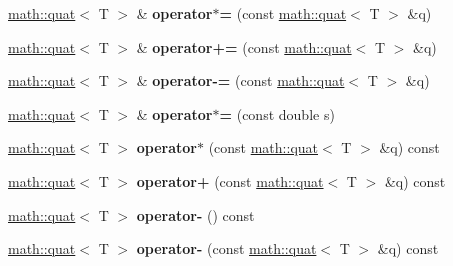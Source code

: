 \begin{DoxyCompactItemize}
\item 
\hypertarget{classmath_1_1quat_a6626f36aa7619c604dff07d86474e6cb}{
\hyperlink{classmath_1_1quat}{math::quat}$<$ T $>$ \& {\bfseries operator$\ast$=} (const \hyperlink{classmath_1_1quat}{math::quat}$<$ T $>$ \&q)}
\label{classmath_1_1quat_a6626f36aa7619c604dff07d86474e6cb}

\item 
\hypertarget{classmath_1_1quat_af9add363c0e1a518cf8fa6c27cabbc13}{
\hyperlink{classmath_1_1quat}{math::quat}$<$ T $>$ \& {\bfseries operator+=} (const \hyperlink{classmath_1_1quat}{math::quat}$<$ T $>$ \&q)}
\label{classmath_1_1quat_af9add363c0e1a518cf8fa6c27cabbc13}

\item 
\hypertarget{classmath_1_1quat_a144a751de05d7e3856a4c0f3d0a8a4de}{
\hyperlink{classmath_1_1quat}{math::quat}$<$ T $>$ \& {\bfseries operator-\/=} (const \hyperlink{classmath_1_1quat}{math::quat}$<$ T $>$ \&q)}
\label{classmath_1_1quat_a144a751de05d7e3856a4c0f3d0a8a4de}

\item 
\hypertarget{classmath_1_1quat_a860283f2b49380f0479b939dfcb04543}{
\hyperlink{classmath_1_1quat}{math::quat}$<$ T $>$ \& {\bfseries operator$\ast$=} (const double s)}
\label{classmath_1_1quat_a860283f2b49380f0479b939dfcb04543}

\item 
\hypertarget{classmath_1_1quat_ae56c2a245dce77fe578551c28072a863}{
\hyperlink{classmath_1_1quat}{math::quat}$<$ T $>$ {\bfseries operator$\ast$} (const \hyperlink{classmath_1_1quat}{math::quat}$<$ T $>$ \&q) const }
\label{classmath_1_1quat_ae56c2a245dce77fe578551c28072a863}

\item 
\hypertarget{classmath_1_1quat_af5e1bc730fc8d6176f3cb80c81eea952}{
\hyperlink{classmath_1_1quat}{math::quat}$<$ T $>$ {\bfseries operator+} (const \hyperlink{classmath_1_1quat}{math::quat}$<$ T $>$ \&q) const }
\label{classmath_1_1quat_af5e1bc730fc8d6176f3cb80c81eea952}

\item 
\hypertarget{classmath_1_1quat_a2bcf2f426dcee4c50f0eafb31eeee9f6}{
\hyperlink{classmath_1_1quat}{math::quat}$<$ T $>$ {\bfseries operator-\/} () const }
\label{classmath_1_1quat_a2bcf2f426dcee4c50f0eafb31eeee9f6}

\item 
\hypertarget{classmath_1_1quat_ac06bb24f8158fcca13605ac497c4b2f6}{
\hyperlink{classmath_1_1quat}{math::quat}$<$ T $>$ {\bfseries operator-\/} (const \hyperlink{classmath_1_1quat}{math::quat}$<$ T $>$ \&q) const }
\label{classmath_1_1quat_ac06bb24f8158fcca13605ac497c4b2f6}


\end{DoxyCompactItemize}
